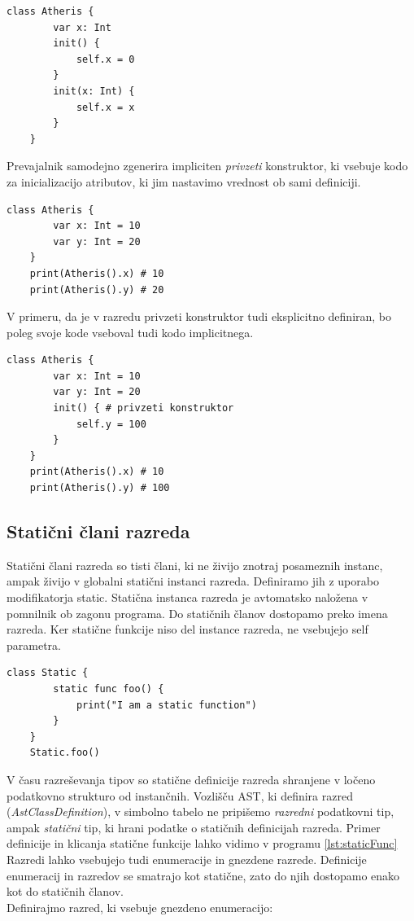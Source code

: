 \documentclass[a4paper, 12p]{book}
\begin{document}
\begin{lstlisting}[caption={Konsturktorji.}, captionpos=b, label={lst:constr1}]
	class Atheris {
	    var x: Int
	    init() {
	        self.x = 0
	    }
	    init(x: Int) {
	        self.x = x
	    }
	}
\end{lstlisting}

\indent Prevajalnik samodejno zgenerira impliciten \textit{privzeti} konstruktor, ki vsebuje kodo za inicializacijo atributov, ki jim nastavimo vrednost ob sami definiciji. 

\begin{lstlisting}[caption={Implicitni privzeti konstruktor.}, captionpos=b, label={lst:constr2}]
	class Atheris {
	    var x: Int = 10
	    var y: Int = 20
	}
	print(Atheris().x) # 10
	print(Atheris().y) # 20
\end{lstlisting}

V primeru, da je v razredu privzeti konstruktor tudi eksplicitno definiran, bo poleg svoje kode vseboval tudi kodo implicitnega.

\begin{lstlisting}[caption={Eksplicitni privzeti konstruktor.}, captionpos=b, label={lst:constr3}]
	class Atheris {
	    var x: Int = 10
	    var y: Int = 20
	    init() { # privzeti konstruktor
	        self.y = 100
	    }
	}
	print(Atheris().x) # 10
	print(Atheris().y) # 100
\end{lstlisting}

\subsection{Statični člani razreda}

Statični člani razreda so tisti člani, ki ne živijo znotraj posameznih instanc, ampak živijo v globalni statični instanci razreda. Definiramo jih z uporabo modifikatorja {\ttfamily static}. Statična instanca razreda je avtomatsko naložena v pomnilnik ob zagonu programa. Do statičnih članov dostopamo preko imena razreda. Ker statične funkcije niso del instance razreda, ne vsebujejo {\ttfamily self} parametra.

\begin{lstlisting}[caption={Klicanje statične funkcije.}, captionpos=b, label={lst:staticFunc}]
    class Static {
        static func foo() {
            print("I am a static function")
        }
    } 
	Static.foo()
\end{lstlisting}

\indent V času razreševanja tipov so statične definicije razreda shranjene v ločeno podatkovno strukturo od instančnih. Vozlišču AST, ki definira razred (\textit{AstClassDefinition}), v simbolno tabelo ne pripišemo \textit{razredni} podatkovni tip, ampak \textit{statični} tip, ki hrani podatke o statičnih definicijah razreda. Primer definicije in klicanja statične funkcije lahko vidimo v programu \ref{lst:staticFunc} \\
\indent Razredi lahko vsebujejo tudi enumeracije in gnezdene razrede. Definicije enumeracij in razredov se smatrajo kot statične, zato do njih dostopamo enako kot do statičnih članov. \\
\indent Definirajmo razred, ki vsebuje gnezdeno enumeracijo:
\end{document}

